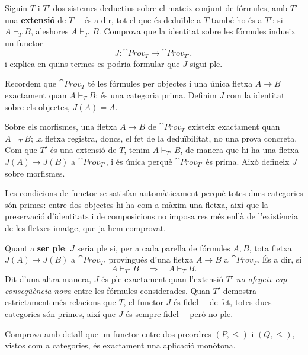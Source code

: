 \begin{exercici}
Siguin $T$ i $T'$ dos sistemes deductius sobre el mateix conjunt de fórmules, amb $T'$ una \textbf{extensió} de $T$ ---és a dir, tot el que és deduïble a $T$ també ho és a $T'$: si $A\vdash_T B$, aleshores $A\vdash_{T'} B$. Comprova que la identitat sobre les fórmules indueix un functor
\[
J\colon\cat{Prov}_T\to\cat{Prov}_{T'},
\]
i explica en quins termes es podria formular que $J$ sigui ple.
\end{exercici}

\begin{solucio}
Recordem que $\cat{Prov}_T$ té les fórmules per objectes i una única fletxa $A\to B$ exactament quan $A\vdash_T B$; és una categoria prima. Definim $J$ com la identitat sobre els objectes, $J(A)=A$.

Sobre els morfismes, una fletxa $A\to B$ de $\cat{Prov}_T$ existeix exactament quan $A\vdash_T B$; la fletxa registra, doncs, el fet de la deduïbilitat, no una prova concreta. Com que $T'$ és una extensió de $T$, tenim $A\vdash_{T'} B$, de manera que hi ha una fletxa $J(A)\to J(B)$ a $\cat{Prov}_{T'}$, i és única perquè $\cat{Prov}_{T'}$ és prima. Això defineix $J$ sobre morfismes.

Les condicions de functor se satisfan automàticament perquè totes dues categories són primes: entre dos objectes hi ha com a màxim una fletxa, així que la preservació d'identitats i de composicions no imposa res més enllà de l'existència de les fletxes imatge, que ja hem comprovat.

Quant a \textbf{ser ple}: $J$ seria ple si, per a cada parella de fórmules $A,B$, tota fletxa $J(A)\to J(B)$ a $\cat{Prov}_{T'}$ provingués d'una fletxa $A\to B$ a $\cat{Prov}_T$. És a dir, si
\[
A\vdash_{T'} B\quad\Longrightarrow\quad A\vdash_T B.
\]
Dit d'una altra manera, $J$ és ple exactament quan l'extensió $T'$ \emph{no afegeix cap conseqüència nova} entre les fórmules considerades. Quan $T'$ demostra estrictament més relacions que $T$, el functor $J$ és fidel ---de fet, totes dues categories són primes, així que $J$ és sempre fidel--- però no ple.
\end{solucio}

\begin{exercici}
Comprova amb detall que un functor entre dos preordres $(P,\leq)$ i $(Q,\leq)$, vistos com a categories, és exactament una aplicació monòtona.
\end{exercici}

